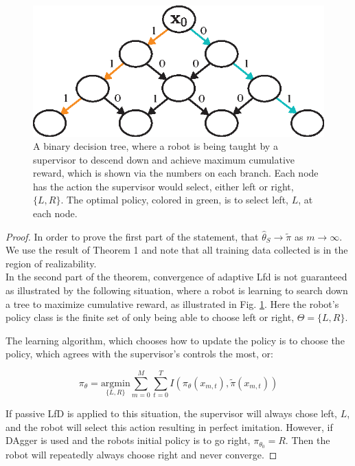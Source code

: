 \documentclass[10pt, conference]{ieeeconf}      %
\begin{document}
\begin{figure}
\centering
\includegraphics{f_figs/counter_exmp.eps}
\caption{
    \footnotesize
A binary decision tree, where a robot is being taught by a supervisor to descend down and achieve maximum cumulative reward, which is shown via the numbers on each branch. Each node has the action the supervisor would select, either left or right, $\lbrace L, R \rbrace$. The optimal policy, colored in green, is to select left, $L$, at each node.}
\vspace*{-20pt}
\label{fig:c_ex}
\end{figure}

\begin{proof}
In order to prove the first part of the statement, that $\hat{\theta}_S \rightarrow \tilde{\pi}$ as  $m \rightarrow \infty$. We  use the result of Theorem 1 and note that all training data collected is in the region of realizability.\\ 

In the second part of the theorem, convergence of adaptive Lfd is not guaranteed as illustrated by the following situation, where a robot is learning to search down a tree to maximize cumulative reward, as illustrated in Fig. \ref{fig:c_ex}. Here the robot's policy class is the finite set of only being able to choose left or right, $\Theta = \lbrace L,R \rbrace$.

The learning algorithm, which chooses how to update the policy is to choose the policy, which agrees with the supervisor's controls the most, or: 

$$\pi_{\theta} = \underset{\lbrace L,R \rbrace}{\mbox{argmin}} \sum^M_{m=0}\sum^T_{t=0} I(\pi_\theta(x_{m,t}),\tilde{\pi}(x_{m,t}))$$

If passive LfD is applied to this situation, the supervisor will always chose left, $L$, and the robot will select this action resulting in perfect imitation. However, if DAgger is used and the robots initial policy is to go right, $\pi_{\theta_0} = R$. Then the robot will repeatedly always choose right and never converge. 

\end{proof}
\end{document}
